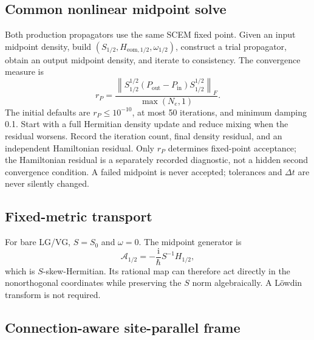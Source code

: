 \documentclass[11pt]{article}
\newcommand{\ii}{\mathrm{i}}
\newcommand{\norm}[1]{\left\lVert#1\right\rVert}
\begin{document}
\subsection{Common nonlinear midpoint solve}

Both production propagators use the same SCEM fixed point. Given an input
midpoint density, build
\((S_{1/2},H_{\mathrm{eom},1/2},\omega_{1/2})\), construct a
trial propagator, obtain an output midpoint density, and iterate to
consistency. The convergence measure is
\begin{equation}
 r_P=
 \frac{
 \norm{S_{1/2}^{1/2}
 (P_{\mathrm{out}}-P_{\mathrm{in}})
 S_{1/2}^{1/2}}_F
 }{\max(N_e,1)}.
 \label{eq:scem-residual}
\end{equation}
The initial defaults are \(r_P\le10^{-10}\), at most 50 iterations, and
minimum damping 0.1. Start with a full Hermitian density update and reduce
mixing when the residual worsens. Record the iteration count, final density
residual, and an independent Hamiltonian residual. Only \(r_P\) determines
fixed-point acceptance; the Hamiltonian residual is a separately recorded
diagnostic, not a hidden second convergence condition. A failed midpoint is
never accepted; tolerances and \(\Delta t\) are never silently changed.

\subsection{Fixed-metric transport}

For bare LG/VG, \(S=S_0\) and \(\omega=0\). The midpoint generator is
\begin{equation}
 \mathcal A_{1/2}
 =-\frac{\ii}{\hbar}S^{-1}H_{1/2},
\end{equation}
which is \(S\)-skew-Hermitian. Its rational map can therefore act directly in
the nonorthogonal coordinates while preserving the \(S\) norm algebraically.
A L\"owdin transform is not required.

\subsection{Connection-aware site-parallel frame}
\end{document}
